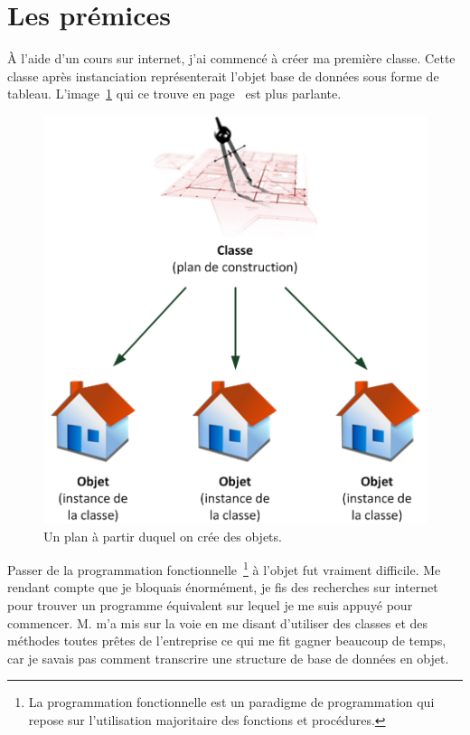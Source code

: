 \section{Les prémices} %
\label{sec:Les prémices}

À l'aide d'un cours sur internet, j'ai commencé à créer ma première classe.
Cette classe après instanciation représenterait l'objet \og base de données
\fg{} sous forme de tableau. L'image~\ref{obj} qui ce trouve en
page~\pageref{obj} est plus parlante.

\begin{figure}
\begin{center}
\includegraphics[scale=0.5]{images/objet.png}
\end{center}
\caption{Un plan à partir duquel on crée des objets.}
\label{obj}
\end{figure}

Passer de la programmation fonctionnelle\, \footnote{La programmation
fonctionnelle est un paradigme de programmation qui repose sur l'utilisation
majoritaire des fonctions et procédures.} à l'objet fut vraiment difficile. Me
rendant compte que je bloquais énormément, je fis des recherches sur internet
pour trouver un programme équivalent sur lequel je me suis appuyé pour
commencer. M. m'a mis sur la voie en me disant d'utiliser des
classes et des méthodes toutes prêtes de l'entreprise ce qui me fit gagner
beaucoup de temps, car je savais pas comment transcrire une structure de base
de données en objet.

